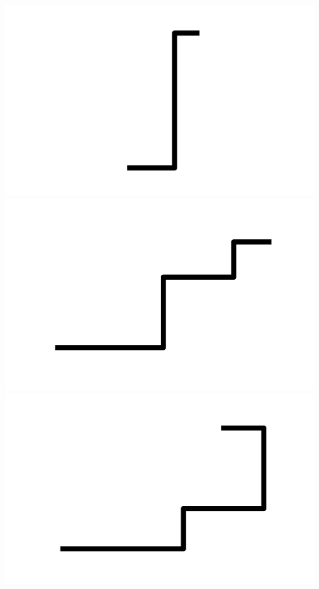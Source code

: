 \documentclass[]{report}
\begin{document}
\includegraphics[scale=.1]{pictures/21/state_cluster_shapes_94.pdf} 
\includegraphics[scale=.1]{pictures/21/state_cluster_shapes_95.pdf} 
\includegraphics[scale=.1]{pictures/21/state_cluster_shapes_96.pdf} 
\end{document}
